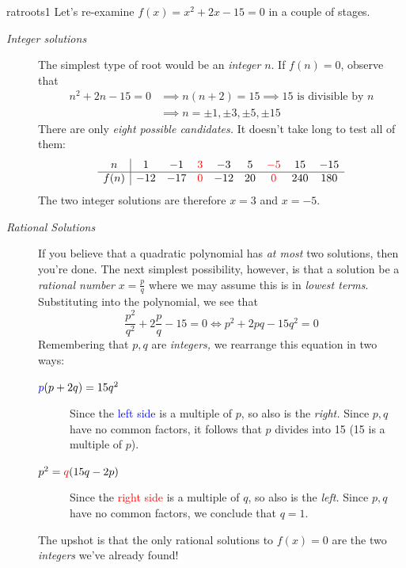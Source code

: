 \begin{example}{}{ratroots1}
Let's re-examine $f(x)=x^2+2x-15=0$ in a couple of stages.
\begin{description}
\item[\normalfont\emph{Integer solutions}] The simplest type of root would be an \emph{integer} $n$. If $f(n)=0$, observe that
\begin{align*}
n^2+2n-15=0&\implies n(n+2)=15\implies \text{15 is divisible by $n$}\\
&\implies n=\pm 1,\pm 3,\pm 5,\pm 15
\end{align*}
There are only \emph{eight possible candidates.} It doesn't take long to test all of them:
\[
\begin{array}{c|cccccccc}
n&1&-1&\textcolor{red}{3}&-3&5&\textcolor{red}{-5}&15&-15\\\hline
f(n)&-12&-17&\textcolor{red}{0}&-12&20&\textcolor{red}{0}&240&180
\end{array}
\]
The two integer solutions are therefore $x=3$ and $x=-5$.
\item[\normalfont\emph{Rational Solutions}] If you believe that a quadratic polynomial has \emph{at most} two solutions, then you're done. The next simplest possibility, however, is that a solution be a \emph{rational number} $x=\frac pq$ where we may assume this is in \emph{lowest terms}.\footnotemark{} Substituting into the polynomial, we see that
\[\frac{p^2}{q^2}+2\frac pq-15=0\iff p^2+2pq-15q^2=0\]
Remembering that $p,q$ are \emph{integers,} we rearrange this equation in two ways:
\begin{description}
  \item[$\textcolor{blue}{p}(p+2q)=15q^2$]\lstsp Since the \textcolor{blue}{left side} is a multiple of $p$, so also is the \emph{right.} Since $p,q$ have no common factors, it follows that $p$ divides into 15 (15 is a multiple of $p$).
  \item[$p^2=\textcolor{red}{q}(15q-2p)$]\lstsp Since the \textcolor{red}{right side} is a multiple of $q$, so also is the \emph{left.} Since $p,q$ have no common factors, we conclude that $q=1$.
\end{description}
The upshot is that the only rational solutions to $f(x)=0$ are the two \emph{integers} we've already found!
\end{description}
\end{example}


